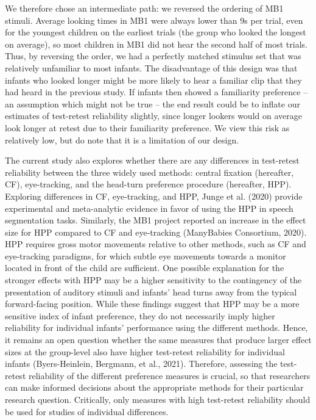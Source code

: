 \documentclass[
  man,floatsintext]{apa6}
\begin{document}
We therefore chose an intermediate path: we reversed the ordering of MB1 stimuli.
Average looking times in MB1 were always lower than 9s per trial, even for the youngest children on the earliest trials (the group who looked the longest on average), so most children in MB1 did not hear the second half of most trials.
Thus, by reversing the order, we had a perfectly matched stimulus set that was relatively unfamiliar to most infants.
The disadvantage of this design was that infants who looked longer might be more likely to hear a familiar clip that they had heard in the previous study.
If infants then showed a familiarity preference -- an assumption which might not be true -- the end result could be to inflate our estimates of test-retest reliability slightly, since longer lookers would on average look longer at retest due to their familiarity preference.
We view this risk as relatively low, but do note that it is a limitation of our design.

The current study also explores whether there are any differences in test-retest reliability between the three widely used methods: central fixation (hereafter, CF), eye-tracking, and the head-turn preference procedure (hereafter, HPP).
Exploring differences in CF, eye-tracking, and HPP, Junge et al. (2020) provide experimental and meta-analytic evidence in favor of using the HPP in speech segmentation tasks.
Similarly, the MB1 project reported an increase in the effect size for HPP compared to CF and eye-tracking (ManyBabies Consortium, 2020).
HPP requires gross motor movements relative to other methods, such as CF and eye-tracking paradigms, for which subtle eye movements towards a monitor located in front of the child are sufficient.
One possible explanation for the stronger effects with HPP may be a higher sensitivity to the contingency of the presentation of auditory stimuli and infants' head turns away from the typical forward-facing position.
While these findings suggest that HPP may be a more sensitive index of infant preference, they do not necessarily imply higher reliability for individual infants' performance using the different methods.
Hence, it remains an open question whether the same measures that produce larger effect sizes at the group-level also have higher test-retest reliability for individual infants (Byers-Heinlein, Bergmann, et al., 2021).
Therefore, assessing the test-retest reliability of the different preference measures is crucial, so that researchers can make informed decisions about the appropriate methods for their particular research question.
Critically, only measures with high test-retest reliability should be used for studies of individual differences.
\end{document}

